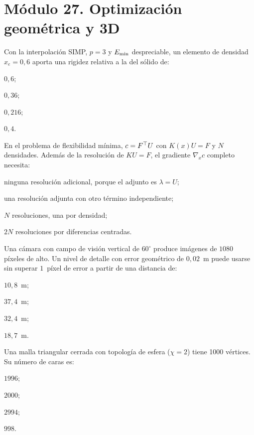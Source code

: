 \section*{Módulo 27. Optimización geométrica y 3D}

\begin{cuestiones}[resume]
\item {} Con la interpolación SIMP, $p=3$ y $E_{\min}$ despreciable, un elemento de densidad $x_e=0{,}6$ aporta una rigidez relativa a la del sólido de:
\begin{opciones}
  \item $0{,}6$;
  \item $0{,}36$;
  \item $0{,}216$;
  \item $0{,}4$.
\end{opciones}

\item {} En el problema de flexibilidad mínima, $c=F^{\top} U$ con $K(x)U=F$ y $N$ densidades. Además de la resolución de $KU=F$, el gradiente $\nabla_xc$ completo necesita:
\begin{opciones}
  \item ninguna resolución adicional, porque el adjunto es $\lambda=U$;
  \item una resolución adjunta con otro término independiente;
  \item $N$ resoluciones, una por densidad;
  \item $2N$ resoluciones por diferencias centradas.
\end{opciones}

\item {} Una cámara con campo de visión vertical de $60^{\circ}$ produce imágenes de $1080$ píxeles de alto. Un nivel de detalle con error geométrico de $0{,}02$~m puede usarse sin superar $1$~píxel de error a partir de una distancia de:
\begin{opciones}
  \item $10{,}8$~m;
  \item $37{,}4$~m;
  \item $32{,}4$~m;
  \item $18{,}7$~m.
\end{opciones}

\item {} Una malla triangular cerrada con topología de esfera ($\chi=2$) tiene 1000 vértices. Su número de caras es:
\begin{opciones}
  \item $1996$;
  \item $2000$;
  \item $2994$;
  \item $998$.
\end{opciones}
\end{cuestiones}

